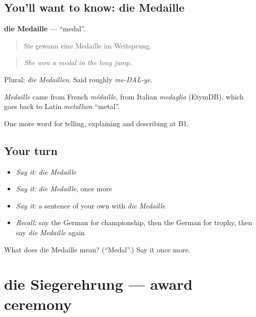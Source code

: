 \subsection*{You'll want to know: die Medaille}
\textbf{die Medaille} — \textquotedblleft{}medal\textquotedblright{}.

\begin{quote}
Sie gewann eine Medaille im Weitsprung.
\end{quote}

\begin{quote}
\emph{She won a medal in the long jump.}
\end{quote}

Plural: \emph{die Medaillen}. Said roughly \emph{me-DAL-ye}.

\begin{cousinweb}
\emph{Medaille} came from French \emph{médaille}, from Italian \emph{medaglia} (EtymDB), which goes back to Latin \emph{metallum} \textquotedblleft{}metal\textquotedblright{}.
\end{cousinweb}

\begin{grammarlens}[title={What you've built}]
One more word for telling, explaining and describing at B1.
\end{grammarlens}

\subsection*{Your turn}
\begin{itemize}
\raggedright
  \item \emph{Say it:} \emph{die Medaille}
  \item \emph{Say it:} \emph{die Medaille}, once more
  \item \emph{Say it:} a sentence of your own with \emph{die Medaille}
  \item \emph{Recall:} say the German for championship, then the German for trophy, then say \emph{die Medaille} again
\end{itemize}

\begin{tcolorbox}[breakable,colback=teal!4,colframe=teal!35!black,title={Before you move on}]
What does die Medaille mean? (\textquotedblleft{}Medal\textquotedblright{}.) Say it once more.
\end{tcolorbox}
\section[die Siegerehrung]{die Siegerehrung — award ceremony}

